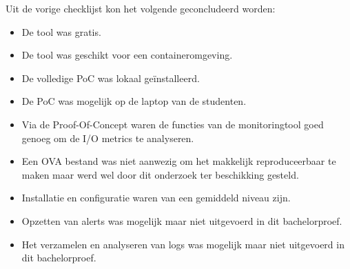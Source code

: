 Uit de vorige checklijst kon het volgende geconcludeerd worden:

\begin{itemize}
    \item De tool was gratis. 
    \item De tool was geschikt voor een containeromgeving.
    \item De volledige PoC was lokaal geïnstalleerd.
    \item De PoC was mogelijk op de laptop van de studenten.
    \item Via de Proof-Of-Concept waren de functies van de monitoringtool goed genoeg om de I/O metrics te analyseren.
    \item Een OVA bestand was niet aanwezig om het makkelijk reproduceerbaar te maken maar werd wel door dit onderzoek ter beschikking gesteld.
    \item Installatie en configuratie waren van een gemiddeld niveau zijn.
    \item Opzetten van alerts was mogelijk maar niet uitgevoerd in dit bachelorproef.
    \item Het verzamelen en analyseren van logs was mogelijk  maar niet uitgevoerd in dit bachelorproef. 
\end{itemize}

